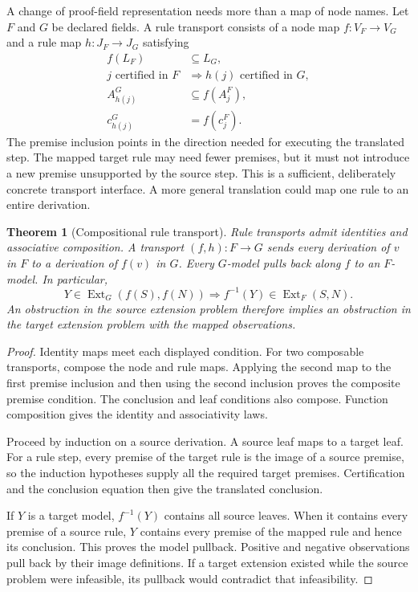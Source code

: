 \documentclass[11pt,oneside]{article}
\theoremstyle{komorebiplain}
\newtheorem{theorem}{Theorem}[section]
\theoremstyle{komorebidefinition}
\theoremstyle{komorebiremark}
\begin{document}
A change of proof-field representation needs more than a map of node names. Let $F$ and $G$ be declared fields. A rule transport consists of a node map $f:V_F\to V_G$ and a rule map $h:J_F\to J_G$ satisfying
\[
\begin{aligned}
 f(L_F)&\subseteq L_G,\\
 j\text{ certified in }F&\Longrightarrow h(j)\text{ certified in }G,\\
 A^G_{h(j)}&\subseteq f(A^F_j),\\
 c^G_{h(j)}&=f(c^F_j).
\end{aligned}
\]
The premise inclusion points in the direction needed for executing the translated step. The mapped target rule may need fewer premises, but it must not introduce a new premise unsupported by the source step. This is a sufficient, deliberately concrete transport interface. A more general translation could map one rule to an entire derivation.

\begin{theorem}[Compositional rule transport]
\label{res:new:transport}
Rule transports admit identities and associative composition. A transport $(f,h):F\to G$ sends every derivation of $v$ in $F$ to a derivation of $f(v)$ in $G$. Every $G$-model pulls back along $f$ to an $F$-model. In particular,
\[
 Y\in\operatorname{Ext}_G(f(S),f(N))
   \Longrightarrow f^{-1}(Y)\in\operatorname{Ext}_F(S,N).
\]
An obstruction in the source extension problem therefore implies an obstruction in the target extension problem with the mapped observations.
\end{theorem}
\begin{proof}
Identity maps meet each displayed condition. For two composable transports, compose the node and rule maps. Applying the second map to the first premise inclusion and then using the second inclusion proves the composite premise condition. The conclusion and leaf conditions also compose. Function composition gives the identity and associativity laws.

Proceed by induction on a source derivation. A source leaf maps to a target leaf. For a rule step, every premise of the target rule is the image of a source premise, so the induction hypotheses supply all the required target premises. Certification and the conclusion equation then give the translated conclusion.

If $Y$ is a target model, $f^{-1}(Y)$ contains all source leaves. When it contains every premise of a source rule, $Y$ contains every premise of the mapped rule and hence its conclusion. This proves the model pullback. Positive and negative observations pull back by their image definitions. If a target extension existed while the source problem were infeasible, its pullback would contradict that infeasibility.
\end{proof}
\end{document}
